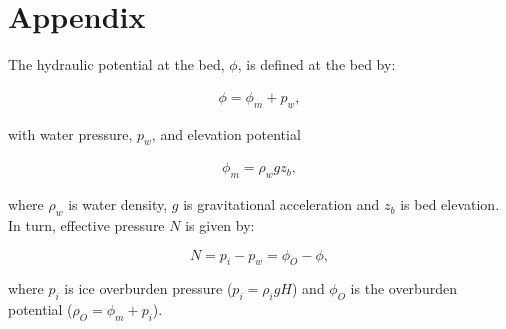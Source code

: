 \documentclass[review,jog]{igs}
\begin{document}



\appendix
\section{Appendix}\label{Appendix:GlaDS}

\setcounter{equation}{0}
\renewcommand\theequation{A\arabic{equation}}

The hydraulic potential at the bed, $\phi$, is defined at the bed by: 

\begin{equation}
\label{appeq:GlaDSdirBC}
\begin{aligned}
\phi = \phi_m + p_w,
\end{aligned}
\end{equation}

with water pressure, $p_{w}$, and elevation potential

\begin{equation}
\label{eq:elevationpotential}
\begin{aligned}
\phi_{m} = \rho_{w}gz_{b},
\end{aligned}
\end{equation}

where $\rho_{w}$ is water density, $g$ is gravitational acceleration and $z_{b}$ is bed elevation. In turn, effective pressure $N$ is given by: 

\begin{equation}
\label{appeqn}
N = p_{i}-p_{w} = \phi_{O}-\phi,
\end{equation}

where $p_{i}$ is ice overburden pressure ($p_{i} = \rho_{i}gH$) and $\phi_{O}$ is the overburden potential ($\rho_{O} = \phi_{m}+p_{i}$).






\end{document}
